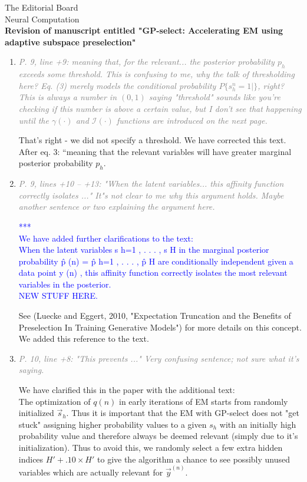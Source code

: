 \documentclass[10pt]{letter}
\newcommand{\rvr}[1]{\textcolor{gray}{#1}}
\newcommand{\rev}[1]{\textcolor{blue}{#1}}
\begin{document}
\begin{letter}{
The Editorial Board\\
Neural Computation\\
\vspace{10mm}
\textbf{Revision of manuscript entitled "GP-select: Accelerating EM using adaptive
subspace preselection"}
}
\begin{enumerate}[topsep=3pt,itemsep=2ex,partopsep=1ex,parsep=1ex]
    \item \rvr{\emph{P. 9, line +9:   meaning that, for the relevant... the posterior probability $p_h$ exceeds some threshold.  This is confusing to me, why the talk of thresholding here? Eq. (3) merely models the conditional probability $P\{ s_h^n = 1 |   \}$, right? This is always a number in $(0,1)$ saying "threshold"  sounds like you're checking if this number is above a certain value, but I don't see that happening until the $\gamma( \cdot )$ and $\mathcal{I}( \cdot )$ functions are introduced on the next page.}}

That’s right - we did not specify a threshold. We have corrected this text. 
After eq. 3: “meaning that the relevant variables will have greater marginal posterior probability $p_h$.

    \item \rvr{\emph{P. 9, lines +10 -- +13: "When the latent variables... this affinity function correctly isolates ..."  It"s not clear to me why this argument holds. Maybe another sentence or two explaining the argument here.}}

\rev{*** \\
We have added further clarifications to the text:\\
When the latent variables s h=1 , . . . , s H in the marginal posterior probability p̂ (n) = p̂ h=1 , . . . , p̂ H are conditionally independent given a data point y (n) , this affinity function correctly isolates the most relevant variables in the posterior. \\
NEW STUFF HERE.}

See (Luecke and Eggert, 2010, "Expectation Truncation and the Benefits of Preselection In Training Generative Models") for more details on this concept. We added this reference to the text.

    \item \rvr{\emph{P. 10, line +8: "This prevents ..."  Very confusing sentence; not sure what it's saying.}}

We have clarified this in the paper with the additional text:\\
The optimization of $q(n)$ in early iterations of EM starts from randomly initialized $\vec{s}_h$. Thus it is important that the EM with GP-select does not "get stuck" assigning higher probability values to a given $s_h$ with an initially high probability value and therefore always be deemed relevant (simply due to it's initialization). Thus to avoid this, we randomly select a few extra hidden indices $H' + .10\times H'$ to give the algorithm a chance to see possibly unused variables which are actually relevant for $\vec{y}^{(n)}$.


\end{enumerate}
\end{letter}
\end{document}
